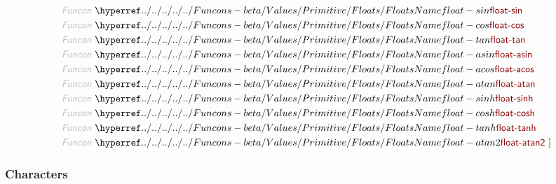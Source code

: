 \begin{align*}
  \KEY{Funcon} ~ & \NAMEHYPER{../../../../../Funcons-beta/Values/Primitive}{Floats}{float-sin} \\
  \KEY{Funcon} ~ & \NAMEHYPER{../../../../../Funcons-beta/Values/Primitive}{Floats}{float-cos} \\
  \KEY{Funcon} ~ & \NAMEHYPER{../../../../../Funcons-beta/Values/Primitive}{Floats}{float-tan} \\
  \KEY{Funcon} ~ & \NAMEHYPER{../../../../../Funcons-beta/Values/Primitive}{Floats}{float-asin} \\
  \KEY{Funcon} ~ & \NAMEHYPER{../../../../../Funcons-beta/Values/Primitive}{Floats}{float-acos} \\
  \KEY{Funcon} ~ & \NAMEHYPER{../../../../../Funcons-beta/Values/Primitive}{Floats}{float-atan} \\
  \KEY{Funcon} ~ & \NAMEHYPER{../../../../../Funcons-beta/Values/Primitive}{Floats}{float-sinh} \\
  \KEY{Funcon} ~ & \NAMEHYPER{../../../../../Funcons-beta/Values/Primitive}{Floats}{float-cosh} \\
  \KEY{Funcon} ~ & \NAMEHYPER{../../../../../Funcons-beta/Values/Primitive}{Floats}{float-tanh} \\
  \KEY{Funcon} ~ & \NAMEHYPER{../../../../../Funcons-beta/Values/Primitive}{Floats}{float-atan2}
  ~ ]
\end{align*}
\subsubsection*{Characters}\hypertarget{characters}{}\label{characters}

\begin{align*}
  [ ~ 
  \KEY{Type} ~ & \NAMEHYPER{../../../../../Funcons-beta/Values/Primitive}{Characters}{characters} \\
  \KEY{Alias} ~ & \NAMEHYPER{../../../../../Funcons-beta/Values/Primitive}{Characters}{chars} \\
  \KEY{Funcon} ~ & \NAMEHYPER{../../../../../Funcons-beta/Values/Primitive}{Characters}{unicode-character} \\
  \KEY{Alias} ~ & \NAMEHYPER{../../../../../Funcons-beta/Values/Primitive}{Characters}{unicode-char} \\
  \KEY{Funcon} ~ & \NAMEHYPER{../../../../../Funcons-beta/Values/Primitive}{Characters}{ascii-character} \\
  \KEY{Alias} ~ & \NAMEHYPER{../../../../../Funcons-beta/Values/Primitive}{Characters}{ascii-char} \\
  \KEY{Funcon} ~ & \NAMEHYPER{../../../../../Funcons-beta/Values/Primitive}{Characters}{backspace} \\
  \KEY{Funcon} ~ & \NAMEHYPER{../../../../../Funcons-beta/Values/Primitive}{Characters}{horizontal-tab} \\
  \KEY{Funcon} ~ & \NAMEHYPER{../../../../../Funcons-beta/Values/Primitive}{Characters}{line-feed} \\
  \KEY{Funcon} ~ & \NAMEHYPER{../../../../../Funcons-beta/Values/Primitive}{Characters}{carriage-return} \\
  \KEY{Funcon} ~ & \NAMEHYPER{../../../../../Funcons-beta/Values/Primitive}{Characters}{backslash}
  ~ ]
\end{align*}
